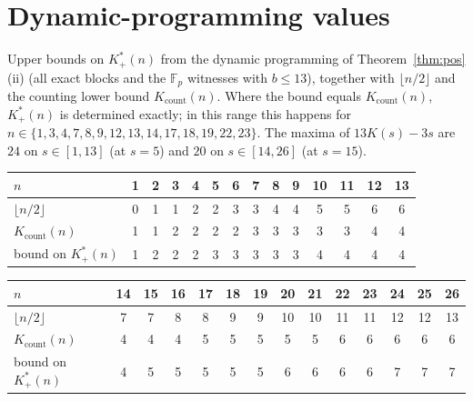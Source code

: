 \documentclass[aps,pra,onecolumn,superscriptaddress,nofootinbib,longbibliography,10pt]{revtex4-2}
\theoremstyle{definition}
\newcommand{\FF}{\mathbb F}
\newcommand{\Kp}{K^{*}_{+}}
\newcommand{\Kc}{K_{\mathrm{count}}}
\begin{document}
\section{Dynamic-programming values}\label{app:dp}
Upper bounds on $\Kp(n)$ from the dynamic programming of Theorem~\ref{thm:pos}(ii) (all exact blocks and the $\FF_p$ witnesses with $b\le13$), together with $\lfloor n/2\rfloor$ and the counting lower bound $\Kc(n)$. Where the bound equals $\Kc(n)$, $\Kp(n)$ is determined exactly; in this range this happens for $n\in\{1,3,4,7,8,9,12,13,14,17,18,19,22,23\}$. The maxima of $13K(s)-3s$ are $24$ on $s\in[1,13]$ (at $s=5$) and $20$ on $s\in[14,26]$ (at $s=15$).

\begin{center}
\begin{tabular}{lccccccccccccc}
\toprule
$n$ & 1 & 2 & 3 & 4 & 5 & 6 & 7 & 8 & 9 & 10 & 11 & 12 & 13\\
\midrule
$\lfloor n/2\rfloor$ & 0 & 1 & 1 & 2 & 2 & 3 & 3 & 4 & 4 & 5 & 5 & 6 & 6\\
$\Kc(n)$ & 1 & 1 & 2 & 2 & 2 & 2 & 3 & 3 & 3 & 3 & 3 & 4 & 4\\
bound on $\Kp(n)$ & 1 & 2 & 2 & 2 & 3 & 3 & 3 & 3 & 3 & 4 & 4 & 4 & 4\\
\bottomrule
\end{tabular}

\medskip
\begin{tabular}{lccccccccccccc}
\toprule
$n$ & 14 & 15 & 16 & 17 & 18 & 19 & 20 & 21 & 22 & 23 & 24 & 25 & 26\\
\midrule
$\lfloor n/2\rfloor$ & 7 & 7 & 8 & 8 & 9 & 9 & 10 & 10 & 11 & 11 & 12 & 12 & 13\\
$\Kc(n)$ & 4 & 4 & 4 & 5 & 5 & 5 & 5 & 5 & 6 & 6 & 6 & 6 & 6\\
bound on $\Kp(n)$ & 4 & 5 & 5 & 5 & 5 & 5 & 6 & 6 & 6 & 6 & 7 & 7 & 7\\
\bottomrule
\end{tabular}

\medskip
\end{center}
\end{document}
